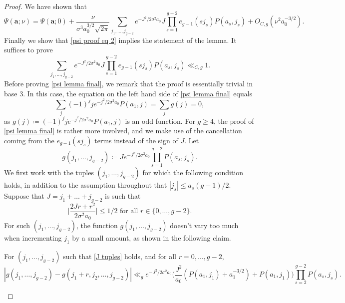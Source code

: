 \documentclass[10pt,a4paper]{amsart}
\newcommand{\ru}[1]{e_{g-1}(#1)}
\renewcommand{\geq}{\geqslant}
\renewcommand{\leq}{\leqslant}
\begin{document}
\begin{proof}
    We have shown that
    \begin{equation}\label{psi proof eq 2}
        \Psi(\mathbf{a};\nu)=\Psi(\mathbf{a};0)+\frac{\nu}{\sigma^{3}a_{0}^{3/2}\sqrt{2\pi}}\sum_{j_{1},\ldots, j_{g-2}}e^{-J^{2}/2\sigma^{2}a_{0}}J\prod_{s=1}^{g-2}\ru{sj_{s}}P(a_{s},j_{s})+O_{C,g}(\nu^{2}a_{0}^{-3/2}).
    \end{equation}
    Finally we show that \cref{psi proof eq 2} implies the statement of the lemma. It suffices to prove
    \begin{equation}\label{psi lemma final}
        \sum_{j_{1},\ldots, j_{g-2}}e^{-J^{2}/2\sigma^{2}a_{0}}J\prod_{s=1}^{g-2}\ru{sj_{s}}P(a_{s},j_{s})\ll_{C,g} 1.
    \end{equation}
Before proving \cref{psi lemma final}, we remark that the proof is essentially trivial in base 3. In this case, the equation on the left hand side of \cref{psi lemma final} equals
\[\sum_{j}(-1)^{j}je^{-j^{2}/2\sigma^{2}a_{0}}P(a_{1},j)=\sum_{j}g(j)=0,\]
as $g(j)\coloneq (-1)^{j}je^{-j^{2}/2\sigma^{2}a_{0}}P(a_{1},j)$ is an odd function. For $g\geq 4$, the proof of \cref{psi lemma final} is rather more involved, and we make use of the cancellation coming from the $\ru{sj_{s}}$ terms instead of the sign of $J$. Let
\begin{equation}\label{g defn}
        g(j_{1},\ldots, j_{g-2})\coloneq Je^{-J^{2}/2\sigma^{2}a_{0}}\prod_{s=1}^{g-2}P(a_{s},j_{s}).
    \end{equation}
We first work with the tuples $(j_{1},\ldots, j_{g-2})$ for which the following condition holds, in addition to the assumption throughout that $|j_{s}|\leq a_{s}(g-1)/2$. Suppose that $J=j_{1}+\ldots+j_{g-2}$ is such that
\begin{equation}\label{J tuples}
    \Big|\frac{2Jr+r^{2}}{2\sigma^{2}a_{0}}\Big |\leq 1/2\textrm{ for all  }r\in \{0,\ldots, g-2\}.
\end{equation}
For such $(j_{1},\ldots, j_{g-2})$, the function $g(j_{1},\ldots, j_{g-2})$ doesn't vary too much when incrementing $j_{1}$ by a small amount, as shown in the following claim.
\begin{claim}\label{g claim}
    For $(j_{1},\ldots, j_{g-2})$ such that \cref{J tuples} holds, and for all $r=0,\ldots, g-2$,
    \[|g(j_{1},\ldots, j_{g-2})-g(j_{1}+r,j_{2},\ldots, j_{g-2})|\ll_{g} e^{-J^{2}/2\sigma^{2}a_{0}}\Big (\frac{J^{2}}{a_{0}}(P(a_{1},j_{1})+a_{1}^{-3/2})+P(a_{1},j_{1})\Big )\prod_{s=2}^{g-2}P(a_{s},j_{s}).\]
\end{claim}


\end{proof}
\end{document}
